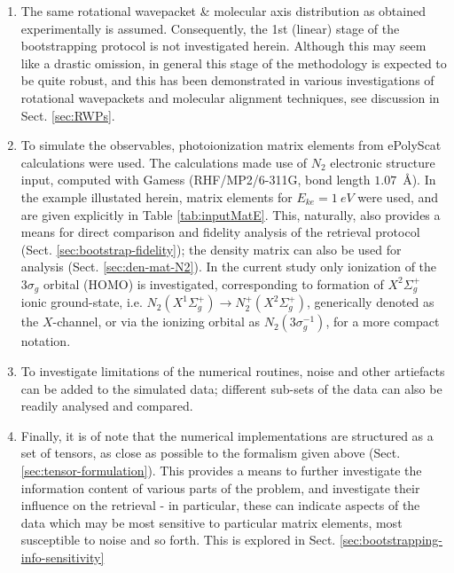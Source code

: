 \begin{enumerate}
\item The same rotational wavepacket \& molecular axis distribution as obtained experimentally is assumed. Consequently, the 1st (linear) stage of the bootstrapping protocol is not investigated herein. Although this may seem like a drastic omission, in general this stage of the methodology is expected to be quite robust, and this has been demonstrated in various investigations of rotational wavepackets and molecular alignment techniques, see discussion in Sect. \ref{sec:RWPs}.
\item To simulate the observables, photoionization matrix elements from ePolyScat \cite{Lucchese1986, Gianturco1994, Natalense1999, luccheseEPolyScatUserManual} calculations were used. The calculations made use of $N_2$ electronic structure input, computed with Gamess \cite{gamess, Gordon} (RHF/MP2/6-311G, bond length $1.07$~\AA). In the example illustated herein, matrix elements for $E_{ke}=1~eV$ were used, and are given explicitly in Table \ref{tab:inputMatE}. This, naturally, also provides a means for direct comparison and fidelity analysis of the retrieval protocol (Sect. \ref{sec:bootstrap-fidelity}); the density matrix can also be used for analysis (Sect. \ref{sec:den-mat-N2}). In the current study only ionization of the $3\sigma_g$ orbital (HOMO) is investigated, corresponding to formation of  $X^2\Sigma_{g}^{+}$ ionic ground-state, i.e. $N_2(X^{1}\Sigma^{+}_{g}) \rightarrow N^+_2(X^{2}\Sigma^{+}_{g})$, generically denoted as the $X$-channel, or via the ionizing orbital as $N_2(3\sigma_g^{-1})$, for a more compact notation. 
\item To investigate limitations of the numerical routines, noise and other artiefacts can be added to the simulated data; different sub-sets of the data can also be readily analysed and compared.
\item Finally, it is of note that the numerical implementations are structured as a set of tensors, as close as possible to the formalism given above (Sect. \ref{sec:tensor-formulation}). This provides a means to further investigate the information content of various parts of the problem, and investigate their influence on the retrieval - in particular, these can indicate aspects of the data which may be most sensitive to particular matrix elements, most susceptible to noise and so forth. This is explored in Sect. \ref{sec:bootstrapping-info-sensitivity}
\end{enumerate}

